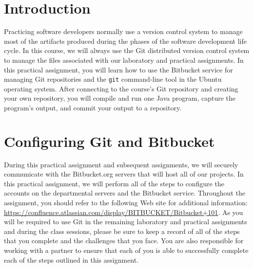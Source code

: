 

\usepackage[compact]{titlesec}



% 

\section*{Introduction}

Practicing software developers normally use a version control system to manage most of the artifacts produced during the
phases of the software development life cycle.  In this course, we will always use the Git distributed version control
system to manage the files associated with our laboratory and practical assignments.  In this practical assignment, you
will learn how to use the Bitbucket service for managing Git repositories and the {\tt git} command-line tool in the
Ubuntu operating system. After connecting to the course's Git repository and creating your own repository, you will
compile and run one Java program, capture the program's output, and commit your output to a repository.

\section*{Configuring Git and Bitbucket}

During this practical assignment and subsequent assignments, we will securely communicate with the Bitbucket.org
servers that will host all of our projects.  In this practical assignment, we will perform all of the steps to configure
the accounts on the departmental servers and the Bitbucket service.  Throughout the assignment, you should refer to the
following Web site for additional information: \url{https://confluence.atlassian.com/display/BITBUCKET/Bitbucket+101}.
As you will be required to use Git in the remaining laboratory and practical assignments and during the class sessions,
please be sure to keep a record of all of the steps that you complete and the challenges that you face.  You are also
responsible for working with a partner to ensure that each of you is able to successfully complete each of the steps
outlined in this assignment.

